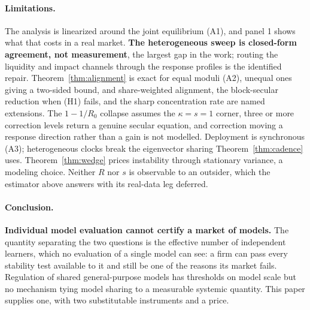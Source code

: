 \documentclass{article}
\theoremstyle{plain}
\theoremstyle{definition}
\begin{document}
\paragraph{Limitations.}
The analysis is linearized around the joint equilibrium (A1), and panel 1 shows what that costs in a real market. \textbf{The heterogeneous sweep is closed-form agreement, not measurement}, the largest gap in the work; routing the liquidity and impact channels through the response profiles is the identified repair. Theorem~\ref{thm:alignment} is exact for equal moduli (A2), unequal ones giving a two-sided bound, and share-weighted alignment, the block-secular reduction when (H1) fails, and the sharp concentration rate are named extensions. The $1-1/R_0$ collapse assumes the $\kappa=s=1$ corner, three or more correction levels return a genuine secular equation, and correction moving a response direction rather than a gain is not modelled. Deployment is synchronous (A3); heterogeneous clocks break the eigenvector sharing Theorem~\ref{thm:cadence} uses. Theorem~\ref{thm:wedge} prices instability through stationary variance, a modeling choice. Neither $R$ nor $s$ is observable to an outsider, which the estimator above answers with its real-data leg deferred.

\paragraph{Conclusion.}
\textbf{Individual model evaluation cannot certify a market of models.} The quantity separating the two questions is the effective number of independent learners, which no evaluation of a single model can see: a firm can pass every stability test available to it and still be one of the reasons its market fails. Regulation of shared general-purpose models has thresholds on model scale but no mechanism tying model sharing to a measurable systemic quantity. This paper supplies one, with two substitutable instruments and a price.
\end{document}
